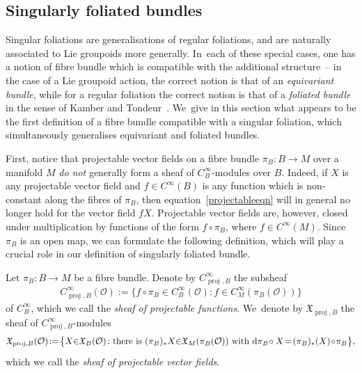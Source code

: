 \documentclass[10pt,a4paper]{amsart}
\numberwithin{equation}{section}
\def\proj{\operatorname{proj}}
\def\OO{{\mathcal{O}}}
\def\XF{{\mathfrak{X}}}
\begin{document}
\subsection{Singularly foliated bundles}

Singular foliations are generalisations of regular foliations, and are naturally associated to Lie groupoids more generally. In~each of these special cases, one has a notion of fibre bundle which is compatible with the additional structure~-- in the case of a Lie groupoid action, the correct notion is that of an \textit{equivariant bundle}, while for a regular foliation the correct notion is that of a \textit{foliated bundle} in the sense of Kamber and Tondeur~\cite{folbund}. We~give in this section what appears to be the first definition of a fibre bundle compatible with a singular foliation, which simultaneously generalises equivariant and foliated bundles.

First, notice that projectable vector fields on a fibre bundle $\pi_{B}\colon B\rightarrow M$ over a manifold $M$ \textit{do not} generally form a sheaf of $C^{\infty}_{B}$-modules over $B$. Indeed, if $X$ is any projectable vector field and $f\in C^{\infty}(B)$ is any function which is non-constant along the fibres of $\pi_{B}$, then equation~\eqref{projectableeqn} will in general no longer hold for the vector field $fX$. Projectable vector fields are, however, closed under multiplication by functions of the form $f\circ\pi_{B}$, where $f\in C^{\infty}(M)$. Since $\pi_{B}$ is an open map, we can formulate the following definition, which will play a crucial role in our definition of singularly foliated bundle.

\begin{Definition}%
Let $\pi_{B}\colon B\rightarrow M$ be a fibre bundle. Denote by $C^{\infty}_{\proj,B}$ the subsheaf
\begin{gather*}
C^{\infty}_{\proj,B}(\OO):=\big\{f\circ\pi_{B}\in C^{\infty}_{B}(\OO)\colon f\in C^{\infty}_{M}(\pi_{B}(\OO))\big\}
\end{gather*}
of $C^{\infty}_{B}$, which we call the \textit{sheaf of projectable functions}. We~denote by $\XF_{\proj,B}$ the sheaf of $C^{\infty}_{\proj,B}$-modules
\begin{gather*}
\XF_{\proj,B}(\OO)\!:=\!\big\{X{\in}\XF_{B}(\OO)\colon \text{there is $(\pi_{B})_{*}X{\in}\XF_{M}(\pi_{B}(\OO))$ with ${\rm d}\pi_{B}\!\circ X\! = \! (\pi_{B})_{*}(X)\!\circ\!\pi_{B}$}\big\},
\end{gather*}
which we call the \textit{sheaf of projectable vector fields}.
\end{Definition}
\end{document}
